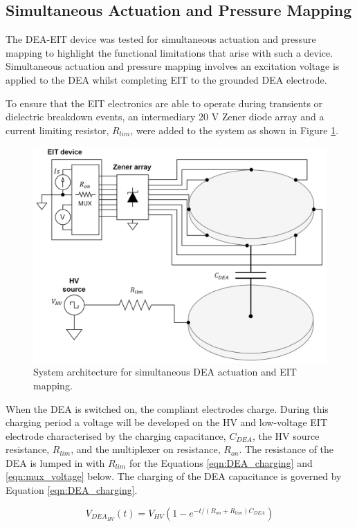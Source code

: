 \subsection{Simultaneous Actuation and Pressure Mapping}
The DEA-EIT device was tested for simultaneous actuation and pressure mapping to highlight the functional limitations that arise with such a device. Simultaneous actuation and pressure mapping involves an excitation voltage is applied to the DEA whilst completing EIT to the grounded DEA electrode.

To ensure that the EIT electronics are able to operate during transients or dielectric breakdown events, an intermediary 20 V Zener diode array and a current limiting resistor, $R_{lim}$, were added to the system as shown in Figure \ref{fig:DEA-EIT_protective_ckt}.
\begin{figure}[H]
	\centering
	\includegraphics[width=12cm]{Figures/DEA-EIT_protected_ckt.png}
	\vspace{0.2cm}
	\caption{System architecture for simultaneous DEA actuation and EIT mapping.}
	\label{fig:DEA-EIT_protective_ckt}
\end{figure}
When the DEA is switched on, the compliant electrodes charge. During this charging period a voltage will be developed on the HV and low-voltage EIT electrode characterised by the charging capacitance, $C_{DEA}$, the HV source resistance, $R_{lim}$, and the multiplexer on resistance, $R_{on}$. The resistance of the DEA is lumped in with $R_{lim}$ for the Equations \ref{eqn:DEA_charging} and \ref{eqn:mux_voltage} below. The charging of the DEA capacitance is governed by Equation \ref{eqn:DEA_charging}.

\begin{equation}
	V_{\mathit{DEA_{\mathit{HV}}}}(t) = V_{\mathit{HV}} (1 - e^{-t / (R_{on}+R_{\mathit{lim}})C_{\mathit{DEA}}})
	\label{eqn:DEA_charging}
\end{equation}

